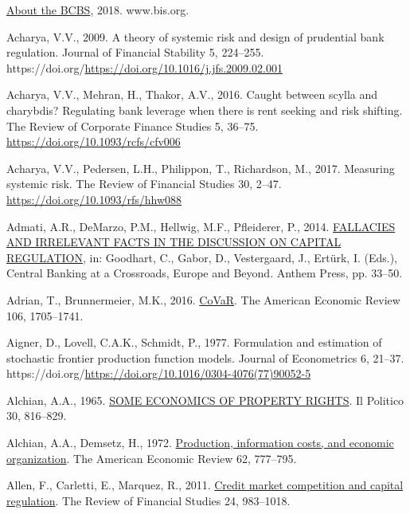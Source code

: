 \documentclass[
  12pt,
  a4paper,
  DIV=11,
  numbers=noendperiod]{scrreprt}
\newlength{\cslhangindent}
\newenvironment{CSLReferences}[2] %
 {\begin{list}{}{%
  \setlength{\itemindent}{0pt}
  \setlength{\leftmargin}{0pt}
  \setlength{\parsep}{0pt}
  \ifodd #1
   \setlength{\leftmargin}{\cslhangindent}
   \setlength{\itemindent}{-1\cslhangindent}
  \fi
  \setlength{\itemsep}{#2\baselineskip}}}
 {\end{list}}
\begin{document}
\label{refs}
\begin{CSLReferences}{1}{0}
\href{https://www.bis.org/bcbs/about/overview.htm?m=85}{About the BCBS},
2018. www.bis.org.

Acharya, V.V., 2009. A theory of systemic risk and design of prudential
bank regulation. Journal of Financial Stability 5, 224--255.
https://doi.org/\url{https://doi.org/10.1016/j.jfs.2009.02.001}

Acharya, V.V., Mehran, H., Thakor, A.V., 2016. Caught between scylla and
charybdis? Regulating bank leverage when there is rent seeking and risk
shifting. The Review of Corporate Finance Studies 5, 36--75.
\url{https://doi.org/10.1093/rcfs/cfv006}

Acharya, V.V., Pedersen, L.H., Philippon, T., Richardson, M., 2017.
Measuring systemic risk. The Review of Financial Studies 30, 2--47.
\url{https://doi.org/10.1093/rfs/hhw088}

Admati, A.R., DeMarzo, P.M., Hellwig, M.F., Pfleiderer, P., 2014.
\href{http://www.jstor.org/stable/j.ctt1gxpd6m.6}{FALLACIES AND
IRRELEVANT FACTS IN THE DISCUSSION ON CAPITAL REGULATION}, in: Goodhart,
C., Gabor, D., Vestergaard, J., Ertürk, I. (Eds.), Central Banking at a
Crossroads, Europe and Beyond. Anthem Press, pp. 33--50.

Adrian, T., Brunnermeier, M.K., 2016.
\href{http://www.jstor.org/stable/43861110}{CoVaR}. The American
Economic Review 106, 1705--1741.

Aigner, D., Lovell, C.A.K., Schmidt, P., 1977. Formulation and
estimation of stochastic frontier production function models. Journal of
Econometrics 6, 21--37.
https://doi.org/\url{https://doi.org/10.1016/0304-4076(77)90052-5}

Alchian, A.A., 1965. \href{http://www.jstor.org/stable/43206327}{SOME
ECONOMICS OF PROPERTY RIGHTS}. Il Politico 30, 816--829.

Alchian, A.A., Demsetz, H., 1972.
\href{http://www.jstor.org/stable/1815199}{Production, information
costs, and economic organization}. The American Economic Review 62,
777--795.

Allen, F., Carletti, E., Marquez, R., 2011.
\href{http://www.jstor.org.queens.ezp1.qub.ac.uk/stable/20869263}{Credit
market competition and capital regulation}. The Review of Financial
Studies 24, 983--1018.


\end{CSLReferences}
\end{document}
